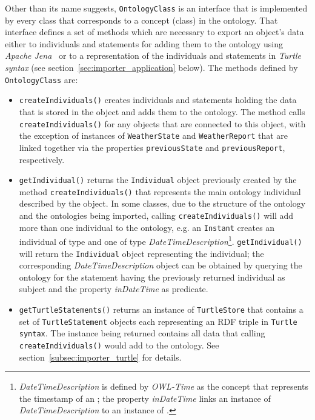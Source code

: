 Other than its name suggests, \texttt{OntologyClass} is an interface that is implemented by every class that corresponds to a concept (class) in the ontology. That interface defines a set of methods which are necessary to export an object's data either to individuals and statements for adding them to the ontology using \emph{Apache Jena}~\cite{apache_jena} or to a representation of the individuals and statements in \emph{Turtle syntax} (see section~\ref{sec:importer_application} below). The methods defined by \texttt{OntologyClass} are:
\begin{itemize}
  \item \texttt{createIndividuals()} creates individuals and statements holding the data that is stored in the object and adds them to the ontology. The method calls \texttt{createIndividuals()} for any objects that are connected to this object, with the exception of instances of \texttt{WeatherState} and \texttt{WeatherReport} that are linked together via the properties \texttt{previousState} and \texttt{previousReport}, respectively.
  
  \item \texttt{getIndividual()} returns the \texttt{Individual} object previously created by the method \texttt{createIndividuals()} that represents the main ontology individual described by the object. In some classes, due to the structure of the \thinkhomeweather ontology and the ontologies being imported, calling \texttt{createIndividuals()} will add more than one individual to the ontology, e.g. an \texttt{Instant} creates an individual of type  and one of type \emph{DateTimeDescription}\footnote{\emph{DateTimeDescription} is defined by \emph{OWL-Time} as the concept that represents the timestamp of an ; the property \emph{inDateTime} links an instance of \emph{DateTimeDescription} to an instance of .}. \texttt{getIndividual()} will return the \texttt{Individual} object representing the  individual; the corresponding \emph{DateTimeDescription} object can be obtained by querying the ontology for the statement having the previously returned
   individual as subject and the property \emph{inDateTime} as predicate.
  
  \item \texttt{getTurtleStatements()} returns an instance of \texttt{TurtleStore} that contains a set of \texttt{TurtleStatement} objects each representing an RDF triple in \texttt{Turtle syntax}. The instance being returned contains all data that calling \texttt{createIndividuals()} would add to the ontology. See section~\ref{subsec:importer_turtle} for details.
  

\end{itemize}

